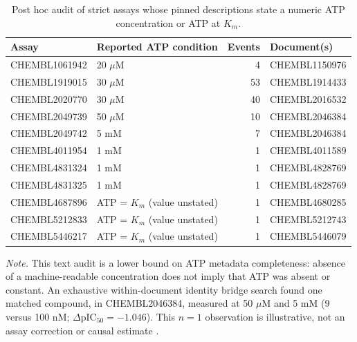 \begin{table}[H]
\centering
\caption{Post hoc audit of strict assays whose pinned descriptions state a numeric ATP concentration or ATP at $K_m$.}
\label{tab:assay-context}
\scriptsize
\setlength{\tabcolsep}{3pt}
\begin{tabular}{L{0.23\textwidth}L{0.23\textwidth}rL{0.27\textwidth}}
\toprule
\textbf{Assay} & \textbf{Reported ATP condition} & \textbf{Events} & \textbf{Document(s)} \\
\midrule
CHEMBL1061942 & 20 $\mu$M & 4 & CHEMBL1150976 \\
CHEMBL1919015 & 30 $\mu$M & 53 & CHEMBL1914433 \\
CHEMBL2020770 & 30 $\mu$M & 40 & CHEMBL2016532 \\
CHEMBL2049739 & 50 $\mu$M & 10 & CHEMBL2046384 \\
CHEMBL2049742 & 5 mM & 7 & CHEMBL2046384 \\
CHEMBL4011954 & 1 mM & 1 & CHEMBL4011589 \\
CHEMBL4831324 & 1 mM & 1 & CHEMBL4828769 \\
CHEMBL4831325 & 1 mM & 1 & CHEMBL4828769 \\
CHEMBL4687896 & ATP = $K_m$ (value unstated) & 1 & CHEMBL4680285 \\
CHEMBL5212833 & ATP = $K_m$ (value unstated) & 1 & CHEMBL5212743 \\
CHEMBL5446217 & ATP = $K_m$ (value unstated) & 1 & CHEMBL5446079 \\
\bottomrule
\end{tabular}
\par\vspace{2pt}\parbox{0.94\textwidth}{\scriptsize \textit{Note.} This text audit is a lower bound on ATP metadata completeness: absence of a machine-readable concentration does not imply that ATP was absent or constant. An exhaustive within-document identity bridge search found one matched compound, in CHEMBL2046384, measured at 50 $\mu$M and 5 mM (9 versus 100 nM; $\Delta$pIC$_{50}=-1.046$). This $n=1$ observation is illustrative, not an assay correction or causal estimate \citep{dakin2012pim}.}
\end{table}
